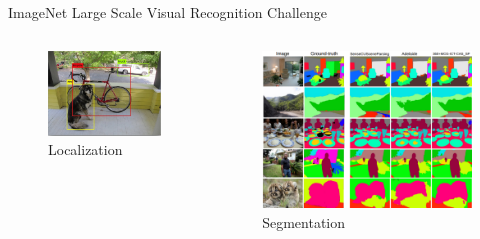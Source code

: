 \begin{frame}[allowframebreaks]{ImageNet Large Scale Visual Recognition Challenge}
\framebreak 

	\begin{columns}
		\begin{column}{.5\textwidth}
			\begin{figure}
				\includegraphics[width=.9\textwidth, center]{figures/object_locationzation_eg1.png}
				\caption*{Localization}
			\end{figure}
		\end{column}
		\begin{column}{.5\textwidth}
			\begin{figure}
				\includegraphics[width=.9\textwidth, center]{figures/semantic_segmentation_eg1.png}
				\caption*{Segmentation}
			\end{figure}
		\end{column}
	\end{columns}


\end{frame}
